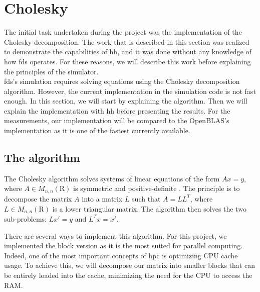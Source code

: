 
\clearpage{}
\section{Cholesky}
\label{sec:cholesky}

The initial task undertaken during the project was the implementation of the
Cholesky decomposition. The work that is described in this section was realized
to demonstrate the capabilities of \gls{hh}, and it was done without any
knowledge of how \gls{fds} operates. For these reasons, we will describe this
work before explaining the principles of the simulator.\\

\gls{fds}'s simulation requires solving equations using the Cholesky
decomposition algorithm. However, the current implementation in the simulation
code is not fast enough. In this section, we will start by explaining the
algorithm. Then we will explain the implementation with \gls{hh} before
presenting the results. For the measurements, our implementation will be
compared to the OpenBLAS's implementation as it is one of the fastest currently
available.

\subsection{The algorithm}
\label{sec:choalgo}

The Cholesky algorithm solves systems of linear equations of the form $Ax = y$,
where $A \in M_{n,n}(\mathrm{R})$ is symmetric and positive-definite
\cite{choleskywiki}. The principle is to decompose the matrix $A$ into a matrix
$L$ such that $A = LL^{T}$, where $L \in M_{n,n}(\mathrm{R})$ is a lower
triangular matrix. The algorithm then solves the two sub-problems: $Lx' = y$ and
$L^{T}x = x'$.

There are several ways to implement this algorithm. For this project, we
implemented the block version as it is the most suited for parallel computing.
Indeed, one of the most important concepts of \gls{hpc} is optimizing CPU cache
usage. To achieve this, we will decompose our matrix into smaller blocks that
can be entirely loaded into the cache, minimizing the need for the CPU to access
the RAM.

